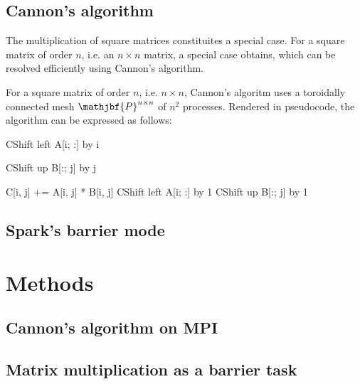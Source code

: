 \documentclass[fleqn,10pt]{SelfArx} %
\begin{document}
\subsection{Cannon's algorithm} %
\label{sub:cannon_s_algorithm}


The multiplication of square matrices constituites a special case. For a square matrix of order $n$, i.e. an $n \times n$ matrix, a special case obtains, which can be resolved efficiently using Cannon's algorithm.\cite{cannon1969cellular} 

For a square matrix of order $n$, i.e. $n \times n$, Cannon's algoritm uses a toroidally connected mesh $\mathjbf{P}^{n \times n}$ of $n^2$ processes. Rendered in pseudocode, the algorithm can be expressed as follows:

\begin{algorithmic}
		\State CShift left A[i; :] by i 
	\EndFor
	
		\State CShift up B[:; j] by j 
	\EndFor
	
			\State C[i, j] += A[i, j] * B[i, j]
			\State CShift left A[i; :] by 1
			\State CShift up B[:; j] by 1
		\EndFor
	\EndFor
\end{algorithmic}

\subsection{Spark's barrier mode} %
\label{sub:spark_s_barrier_mode}



\section{Methods} %
\label{sec:methods}

\subsection{Cannon's algorithm on MPI} %
\label{sub:cannon_s_algorithm_on_mpi}


\subsection{Matrix multiplication as a barrier task} %
\label{sub:matrix_multiplication_as_a_barrier_task}
\end{document}

